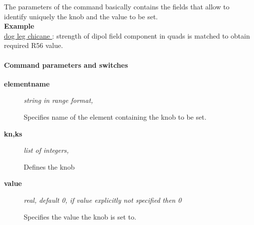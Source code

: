  The parameters of the command basically contains the fields that allow to identify uniquely the knob and the value to be set.    \\

\textbf{ Example }\\

\href{http://cern.ch/frs/mad-X_examples/ptc_madx_interface/matchknobs/matchknobs.madx}{  dog leg chicane } : strength of dipol field component in quads is matched to obtain required R56 value.  


\paragraph{ Command parameters and switches }
\begin{description}
	\item[\textbf{ elementname }] \textit{ string in range format, }

 Specifies name of the element containing the knob to be set.   
	\item[\textbf{ kn,ks }] \textit{ list of integers,   }

 Defines the knob   
	\item[\textbf{ value }] \textit{ real, default 0, if value explicitly not specified then 0}

 Specifies the value the knob is set to.             
\end{description}



% 
% 
% 
% 


